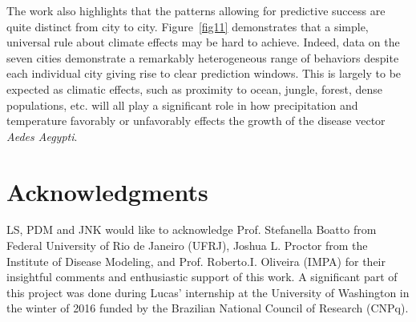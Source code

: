 \documentclass[final,leqno]{siamltexmm2}
\begin{document}
The work also highlights that the patterns allowing for predictive success are quite distinct from
city to city.   Figure~\ref{fig11} demonstrates that a simple, universal rule about climate effects may be hard
to achieve.  Indeed, data on the seven cities demonstrate a remarkably heterogeneous range of behaviors despite
each individual city giving rise to clear prediction windows.  This is largely to be expected as climatic
effects, such as proximity to ocean, jungle, forest, dense populations, etc. will all play a significant
role in how precipitation and temperature favorably or unfavorably effects the growth of the disease
vector {\em Aedes Aegypti}.  


\section*{Acknowledgments}
LS, PDM and JNK would like to acknowledge Prof. Stefanella Boatto from 
Federal University of Rio de Janeiro (UFRJ), Joshua L. Proctor from the Institute of Disease Modeling, and Prof. Roberto.I. Oliveira (IMPA) for their insightful comments and 
enthusiastic support of this work. A significant part of this project was done during
Lucas' internship at the University of Washington in the winter of 2016 funded by 
the Brazilian National Council of Research (CNPq).   
\end{document}
